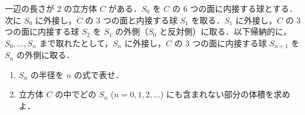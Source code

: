 \documentclass[../../main.tex]{subfiles}
\begin{document}
一辺の長さが $2$ の立方体 $C$ がある．$S_0$ を $C$ の $6$ つの面に内接する球とする．次に $S_0$ に外接し，$C$ の $3$ つの面と内接する球 $S_1$ を取る．$S_1$ に外接し，$C$ の $3$ つの面に内接する球 $S_2$ を $S_1$ の外側（$S_0$ と反対側）に取る．以下帰納的に，$S_0, \ldots, S_n$ まで取れたとして，$S_n$ に外接し，$C$ の $3$ つの面に内接する球 $S_{n+1}$ を $S_n$ の外側に取る．
\begin{enumerate}
  \item $S_n$ の半径を $n$ の式で表せ．
  \item 立方体 $C$ の中でどの $S_n$ ($n=0,1,2,\ldots$) にも含まれない部分の体積を求めよ．
\end{enumerate}
\end{document}

